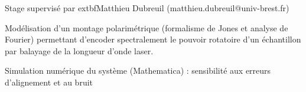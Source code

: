 \documentclass[9pt,a4paper,academicons]{altacv}
\begin{document}
\divider


	
Stage supervisé par 	extbf{Matthieu Dubreuil} (matthieu.dubreuil@univ-brest.fr)

\begin{cvlistdescription}
		\item Modélisation d'un montage polarimétrique (formalisme de Jones et analyse de Fourier) permettant d'encoder spectralement le pouvoir rotatoire d'un échantillon par balayage de la longueur d'onde laser.
		\item Simulation numérique du système (Mathematica) : sensibilité aux erreurs d'alignement et au bruit
\end{cvlistdescription}
\end{document}
